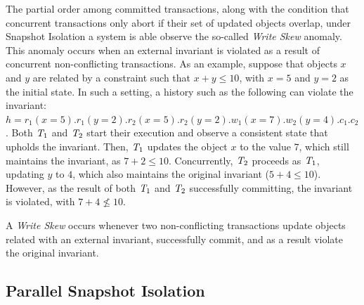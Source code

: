 The partial order among committed transactions, along with the condition that concurrent transactions only abort if their set of updated objects overlap, under Snapshot Isolation a system is able observe the so-called \emph{Write Skew} anomaly. This anomaly occurs when an external invariant is violated as a result of concurrent non-conflicting transactions. As an example, suppose that objects $x$ and $y$ are related by a constraint such that $x + y \le 10$, with $x = 5$ and $y = 2$ as the initial state. In such a setting, a history such as the following can violate the invariant: $h = r_1(x=5).r_1(y=2).r_2(x=5).r_2(y=2).w_1(x=7).w_2(y=4).c_1.c_2$. Both $\mathit{T}_1$ and $\mathit{T}_2$ start their execution and observe a consistent state that upholds the invariant. Then, $\mathit{T}_1$ updates the object $x$ to the value $7$, which still maintains the invariant, as $7 + 2 \le 10$. Concurrently, $\mathit{T}_2$ proceeds as $\mathit{T}_1$, updating $y$ to $4$, which also maintains the original invariant ($5 + 4 \le 10$). However, as the result of both $\mathit{T}_1$ and $\mathit{T}_2$ successfully committing, the invariant is violated, with $7 + 4 \not\le 10$.




\begin{definition}
A \emph{Write Skew} occurs whenever two non-conflicting transactions update objects related with an external invariant, successfully commit, and as a result violate the original invariant.
\end{definition}

\subsection{Parallel Snapshot Isolation}
